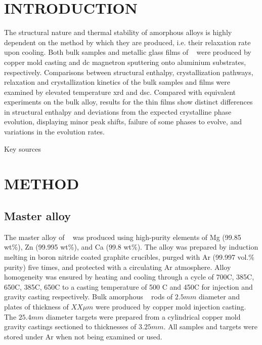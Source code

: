 \documentclass[a4paper,12pt,oneside]{article}%
\begin{document}
\newpage
\tableofcontents\newpage
{}
\clearpage %


\section{INTRODUCTION}
\glsresetall

The structural nature and thermal stability of amorphous alloys is highly dependent on the method by which they are produced, i.e. their relaxation rate upon cooling.  Both bulk samples and metallic glass films of \MgZnCa~ were produced by copper mold casting and \gls{dc} magnetron sputtering onto aluminium substrates, respectively. Comparisons between structural enthalpy, crystallization pathways, relaxation and crystallization kinetics of the bulk samples and films were examined by elevated temperature \acrshort{xrd} and \acrshort{dsc}. Compared with equivalent experiments on the bulk alloy, results for the thin films show distinct differences in structural enthalpy and deviations from the expected crystalline phase evolution, displaying minor peak shifts, failure of some phases to evolve, and variations in the evolution rates. 

Key sources \cite{Zhang2013, Zhang2012} 
\cite{Zhang2011}


\section{METHOD}

\subsection{Master alloy}
The master alloy of \MgZnCa~ was produced using high-purity elements of Mg (99.85 wt\%), Zn (99.995 wt\%), and Ca (99.8 wt\%). The alloy was prepared by induction melting in boron nitride coated graphite crucibles, purged with Ar (99.997 vol.\% purity) five times, and protected with a circulating Ar atmosphere. Alloy homogeneity was ensured by heating and cooling through a cycle of 700\degree C, 385\degree C, 650\degree C, 385\degree C, 650\degree C to a casting temperature of 500 \degree C and 450\degree C for injection and gravity casting respectively. Bulk amorphous \MgZnCa~ rods of $2.5 mm$ diameter and plates of thickness of $XX \mu m$ were produced by copper mold injection casting. The $25.4 mm$ diameter targets were prepared from a cylindrical copper mold gravity castings sectioned to thicknesses of $3.25 mm$. All samples and targets were stored under Ar when not being examined or used. 
\end{document}
